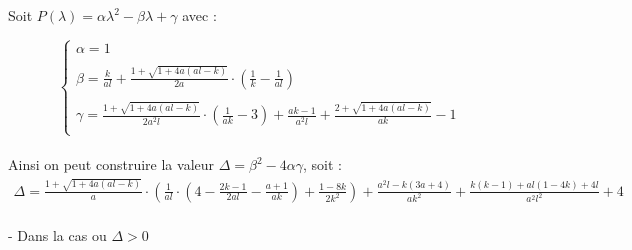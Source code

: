 \documentclass{article}
\begin{document}
Soit $ P(\lambda)= \alpha \lambda^{2} - \beta \lambda + \gamma$ avec : 

\begin{equation*}
\left \{
\begin{array}{l}
     \alpha = 1\\\\
     \beta =  \frac{k}{al} + \frac{1 + \sqrt{1 + 4a(al -k)}}{2a} \cdot \left( \frac{1}{k} - \frac{1}{al} \right) \\\\
     \gamma = \frac{1 + \sqrt{1 + 4a(al -k)}}{2a^2 l} \cdot \left( \frac{1}{ak} - 3 \right) + \frac{ak - 1}{a^2 l} + \frac{2 + \sqrt{1 + 4a(al -k)}}{ak} - 1\\
\end{array}
\right.
\end{equation*}\\

Ainsi on peut construire la valeur $ \Delta = \beta^2 - 4 \alpha \gamma $, soit :\\ 
\begin{equation}
    \tag{ \Delta }
    \label{pt5:delta}
    \begin{array}{ll}
        \Delta = \frac{1 + \sqrt{1 + 4a(al -k)}}{a} \cdot \left( \frac{1}{al} \cdot \left( 4 - \frac{2k-1}{2al} - \frac{a+1}{ak} \right) + \frac{1-8k}{2k^2} \right) + \frac{a^2 l - k (3a+4)}{ak^2} + \frac{k(k-1) + al(1-4k) + 4l}{a^2 l^2} + 4 \\
    \end{array}
\end{equation}



\vfill
\noindent
- Dans la cas ou $\Delta > 0$\\
\end{document}
